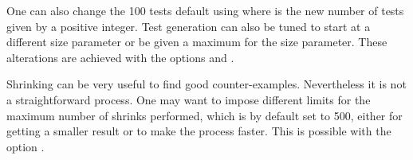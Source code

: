 
%
%
%


%
%
%


%
One can also change the 100 tests default  using  where
 is the new number of tests given by a positive integer.
%
%
Test generation can also be tuned to start at a different size parameter
or be given a maximum for the size parameter.
%
These alterations are achieved with the options
 and .


Shrinking can be very useful to find good counter-examples.
%
Nevertheless it is not a straightforward process.
%
One may want to impose different limits for the maximum
number of shrinks performed, which is by default set to 500, either for getting 
a smaller result or to make the process faster.
%
This is possible with the option .
%

